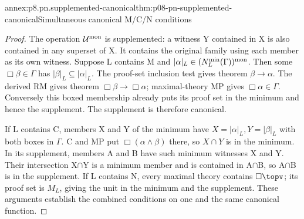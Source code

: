 \begin{annexitem}{annex:p8.pn.supplemented-canonical}{thm:p08-pn-supplemented-canonical}{Simultaneous canonical M/C/N conditions}
\begin{proof}
The operation \(\mathcal U^{\rm mon}\) is supplemented:
a witness Y contained in X is also contained in any superset of X.
It contains the original family using each member as its own witness.
Suppose L contains M and
\(|\alpha|_L\in(N_L^{\min}(\Gamma))^{\rm mon}\).
Then some \(\Box\beta\in\Gamma\) has
\(|\beta|_L\subseteq|\alpha|_L\). The proof-set inclusion
test gives theorem \(\beta\to\alpha\). The derived RM
gives theorem \(\Box\beta\to\Box\alpha\); maximal-theory
MP gives \(\Box\alpha\in\Gamma\). Conversely this boxed
membership already puts its proof set in the minimum and hence
the supplement. The supplement is therefore canonical.

If L contains C, members X and Y of the minimum have
\(X=|\alpha|_L,Y=|\beta|_L\) with both boxes in \(\Gamma\).
C and MP put \(\Box(\alpha\land\beta)\) there, so
\(X\cap Y\) is in the minimum. In its supplement,
members A and B have such minimum witnesses X and Y.
Their intersection X\(\cap\)Y is a minimum member and is
contained in A\(\cap\)B, so A\(\cap\)B is in the supplement.
If L contains N, every maximal theory contains
\(\Box\topv\); its proof set is \(M_L\), giving the unit
in the minimum and the supplement. These arguments establish
the combined conditions on one and the same canonical function.
\end{proof}
\end{annexitem}

